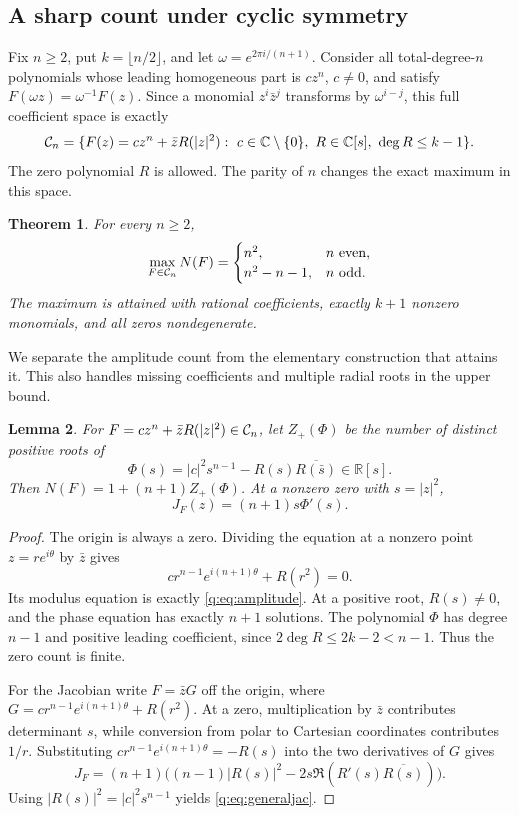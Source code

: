 \documentclass[UTF8,11pt]{ctexart}
\newtheorem{thm}{Theorem}[section]
\newtheorem{lem}[thm]{Lemma}
\theoremstyle{definition}
\numberwithin{equation}{section}
\newcommand{\C}{\mathbb C}\newcommand{\R}{\mathbb R}
\begin{document}
\subsection{A sharp count under cyclic symmetry}\label{q:sec:cyclic}
Fix $n\ge2$, put $k=\lfloor n/2\rfloor$, and let
$\omega=e^{2\pi i/(n+1)}$. Consider all total-degree-$n$ polynomials
whose leading homogeneous part is $cz^n$, $c\ne0$, and satisfy
$F(\omega z)=\omega^{-1}F(z)$. Since a monomial $z^i\bar z^j$ transforms
by $\omega^{i-j}$, this full coefficient space is exactly
\[
 \Ccal_n=\{F(z)=cz^n+\bar z R(|z|^2):\ c\in\C\setminus\{0\},\
                    R\in\C[s],\ \deg R\le k-1\}.
\]
The zero polynomial $R$ is allowed. The parity of $n$ changes the exact
maximum in this space.
\begin{thm}\label{q:thm:cyclic}
For every $n\ge2$,
\begin{equation}\label{q:eq:cyclicmaximum}
 \max_{F\in\mathcal C_n}N(F)=
 \begin{cases}
 n^2,&n\text{ even},\\
 n^2-n-1,&n\text{ odd}.
 \end{cases}
\end{equation}
The maximum is attained with rational coefficients, exactly $k+1$
nonzero monomials, and all zeros nondegenerate.
\end{thm}

We separate the amplitude count from the elementary construction that
attains it. This also handles missing coefficients and multiple radial
roots in the upper bound.
\begin{lem}\label{q:lem:amplitude}
For $F=cz^n+\bar zR(|z|^2)\in\mathcal C_n$, let $Z_+(\Phi)$ be the number
of distinct positive roots of
\begin{equation}\label{q:eq:amplitude}
 \Phi(s)=|c|^2s^{n-1}-R(s)\overline{R(\bar s)}\in\R[s].
\end{equation}
Then $N(F)=1+(n+1)Z_+(\Phi)$. At a nonzero zero with $s=|z|^2$,
\begin{equation}\label{q:eq:generaljac}
 J_F(z)=(n+1)s\Phi'(s).
\end{equation}
\end{lem}
\begin{proof}
The origin is always a zero. Dividing the equation at a nonzero point
$z=re^{i\theta}$ by $\bar z$ gives
\[
 c r^{n-1}e^{i(n+1)\theta}+R(r^2)=0.
\]
Its modulus equation is exactly \eqref{q:eq:amplitude}. At a positive
root, $R(s)\ne0$, and the phase equation has exactly $n+1$ solutions.
The polynomial $\Phi$ has degree $n-1$ and positive leading coefficient,
since $2\deg R\le2k-2<n-1$. Thus the zero count is finite.

For the Jacobian write $F=\bar zG$ off the origin, where
$G=cr^{n-1}e^{i(n+1)\theta}+R(r^2)$. At a zero, multiplication by
$\bar z$ contributes determinant $s$, while conversion from polar to
Cartesian coordinates contributes $1/r$. Substituting
$cr^{n-1}e^{i(n+1)\theta}=-R(s)$ into the two derivatives of $G$ gives
\[
 J_F=(n+1)\bigl((n-1)|R(s)|^2-2s\Re(R'(s)\overline{R(s)})\bigr).
\]
Using $|R(s)|^2=|c|^2s^{n-1}$ yields \eqref{q:eq:generaljac}.
\end{proof}
\end{document}
